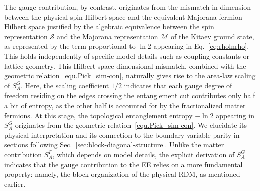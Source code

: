 {The gauge contribution, by contrast, originates from the mismatch in dimension between the physical spin Hilbert space and the equivalent Majorana-fermion Hilbert space justified by the algebraic equivalence between the spin representation $\mathcal{S}$ and the Majorana representation $\mathcal{M}$ of the Kitaev ground state, as represented by the term proportional to $\ln 2$ appearing in Eq.~\eqref{eq:rholnrho}. This holds independently of specific model details such as coupling constants or lattice geometry. This Hilbert-space dimensional mismatch, combined with the geometric relation~\eqref{equ.Pick_sim-con}, naturally gives rise to the area-law scaling of $S^G_A$. Here, the scaling coefficient $1/2$ indicates that each gauge degree of freedom residing on the edges crossing the entanglement cut contributes only half a bit of entropy, as the other half is accounted for by the fractionalized matter fermions. At this stage, the topological entanglement entropy $-\ln 2$ appearing in $S^G_A$ originates from the geometric relation~\eqref{equ.Pick_sim-con}. We elucidate its physical interpretation and its connection to the boundary-variable parity in sections following Sec.~\ref{sec:block-diagonal-structure}. Unlike the matter contribution $S^F_A$, which depends on model details, the explicit derivation of $S^G_A$ indicates that the gauge contribution to the EE relies on a more fundamental property: namely, the block organization of the physical RDM, as mentioned earlier.
}



